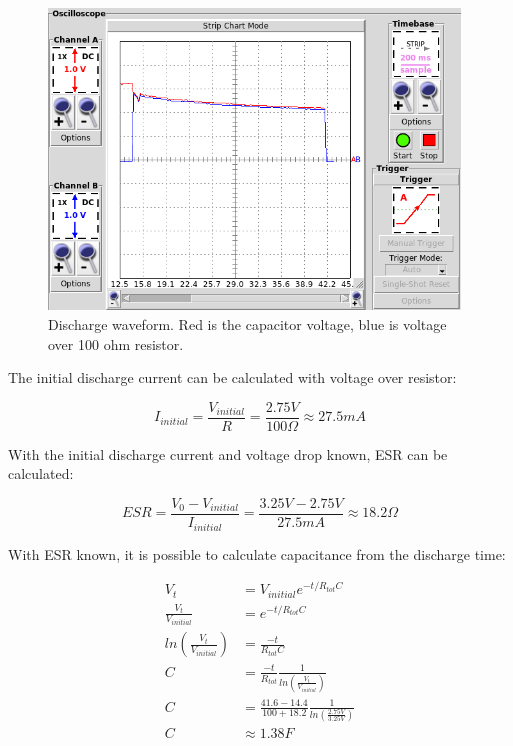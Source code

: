 \begin{figure}[htb]
\begin{center}
\includegraphics[height=8cm]{images/own_measurement/circuit/discharge.png}
\end{center}
\caption{\label{fig:scap_discharge} Discharge waveform. Red is the capacitor voltage, blue is voltage over 100 ohm resistor.}
\end{figure}

The initial discharge current can be calculated with voltage over resistor:

\begin{equation}
  I_{initial} = \frac{V_{initial}}{R} = \frac{2.75 V}{100 \Omega} \approx 27.5 mA 
\end{equation}

With the initial discharge current and voltage drop known, ESR can be calculated:

\begin{equation}
  ESR = \frac{V_{0} - V_{initial}}{I_{initial}} = \frac{3.25 V - 2.75 V}{27.5 mA} \approx 18.2 \Omega
\end{equation}

With ESR known, it is possible to calculate capacitance from the discharge time:

\begin{equation}
\begin{split}
  V_t                            &= V_{initial}e^{-t/R_{tot}C} \\
  \frac{V_t}{V_{initial}}                &= e^{-t/R_{tot}C} \\
  ln\left(\frac{V_t}{V_{initial}}\right) &= \frac{-t}{R_{tot}C} \\
  C                              &= \frac{-t}{R_{tot}} \frac{1}{ ln\left(\frac{V_t}{V_{initial}}\right)} \\
  C                              &= \frac{41.6-14.4}{100 + 18.2} \frac{1}{ ln\left(\frac{2.75 V}{3.25 V}\right)} \\
  C                              &\approx 1.38 F
\end{split}
\end{equation}

